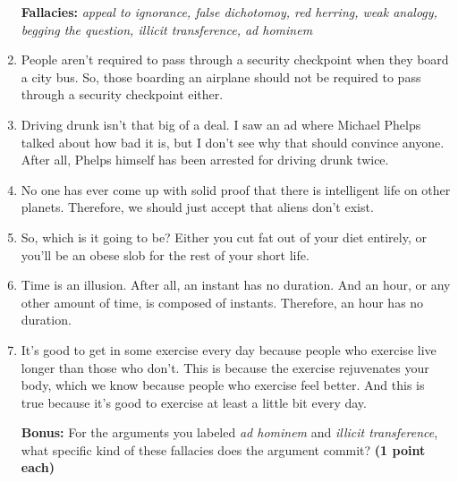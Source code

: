 \documentclass[10pt]{article}
\begin{document}
\begin{enumerate}
\begin{center}\textbf{Fallacies:} \textit{appeal to ignorance, false dichotomoy, red herring, weak analogy, begging the question, illicit transference, ad hominem} \end{center}


\item People aren't required to pass through a security checkpoint when they board a city bus. So, those boarding an airplane should not be required to pass through a security checkpoint either. \underline{\hspace{2in}}

\item Driving drunk isn't that big of a deal. I saw an ad where Michael Phelps talked about how bad it is, but I don't see why that should convince anyone. After all, Phelps himself has been arrested for driving drunk twice. \underline{\hspace{2in}}

\item No one has ever come up with solid proof that there is intelligent life on other planets. Therefore, we should just accept that aliens don't exist. \underline{\hspace{2in}}

\item So, which is it going to be? Either you cut fat out of your diet entirely, or you'll be an obese slob for the rest of your short life. 

\underline{\hspace{2in}}

\item Time is an illusion. After all, an instant has no duration. And an hour, or any other amount of time, is composed of instants. Therefore, an hour has no duration. \underline{\hspace{2in}}

\item It’s good to get in some exercise every day because people who exercise live longer than those who don’t. This is because the exercise rejuvenates your body, which we know because people who exercise feel better. And this is true because it's good to exercise at least a little bit every day. \underline{\hspace{2in}}


\textbf{Bonus:} For the arguments you labeled \textit{ad hominem} and \textit{illicit transference}, what specific kind of these fallacies does the argument commit? \textbf{(1 point each)}


\end{enumerate}
\end{document}
